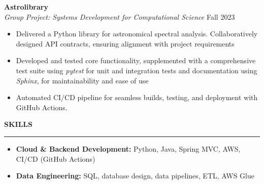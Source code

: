 \documentclass[11pt,a4paper]{article}
\newcommand{\sectionheading}[1]{\vspace{0.2cm}\textbf{\Large #1}\vspace{0.1cm}\hrule\vspace{0.3cm}}
\newcommand{\subheading}[1]{\textbf{#1}}
\newcommand{\daterange}[1]{\hfill{#1}}
\begin{document}
\subheading{Astrolibrary} \\
\textit{Group Project: Systems Development for Computational Science} \daterange{Fall 2023}
\begin{itemize}[leftmargin=*,nosep]
    \item Delivered a Python library for astronomical spectral analysis. Collaboratively designed API contracts, ensuring alignment with project requirements
    \item Developed and tested core functionality, supplemented with a comprehensive test suite using \textit{pytest} for unit and integration tests and documentation using \textit{Sphinx}, for maintainability and ease of use
    \item Automated CI/CD pipeline for seamless builds, testing, and deployment with GitHub Actions.
\end{itemize}


\sectionheading{SKILLS}
\begin{itemize}[leftmargin=*,nosep]
    \item \textbf{Cloud \& Backend Development:} Python, Java, Spring MVC,  AWS, CI/CD (GitHub Actions)
    \item \textbf{Data Engineering:} SQL, database design, data pipelines, ETL, AWS Glue
\end{itemize}
\end{document}
